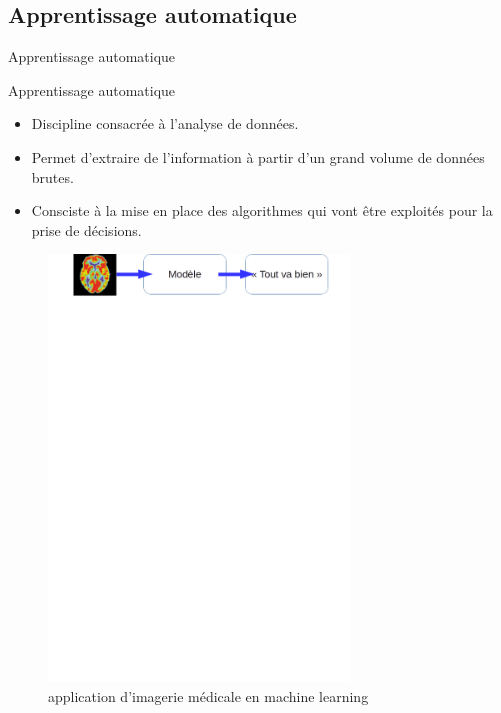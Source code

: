 \documentclass{beamer}
\begin{document}
  \subsection{Apprentissage automatique}
 
  \begin{frame}{Apprentissage automatique}
  \begin{block}{Apprentissage automatique}
  \begin{itemize}
    \item{Discipline consacrée à l'analyse de données.}
  	\item{Permet d'extraire de l'information à partir d'un grand volume de données brutes.}
    \item{Consciste à la mise en place des algorithmes qui vont être exploités	 pour la prise de décisions.}
  \end{itemize}
  \end{block}
  \begin{figure}[h!]\begin{center}
  \caption{application d'imagerie médicale en machine learning}
         \includegraphics[width=8cm]{brain.png}
            
            \end{center}
        \end{figure}

    \end{frame}
\end{document}
